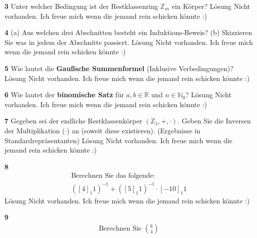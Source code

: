 \documentclass[11pt]{article}
\begin{document}
    \textbf{3} Unter welcher Bedingung ist der Restklassenring \(\mathbb{Z}_m\) ein Körper?\newline
    Lösung Nicht vorhanden. Ich freue mich wenn die jemand rein schicken könnte :)\newline

    \textbf{4} (a) Aus welchen drei Abschnitten besteht ein Induktions-Beweis? (b) Skizzieren Sie was in jedem der Abschnitte passiert.\newline
    Lösung Nicht vorhanden. Ich freue mich wenn die jemand rein schicken könnte :)\newline
    
    \textbf{5} Wie lautet die \textbf{Gaußsche Summenformel} (Inklusive Verbedingungen)?\newline
    Lösung Nicht vorhanden. Ich freue mich wenn die jemand rein schicken könnte :)\newline

    \textbf{6} Wie lautet der \textbf{binomische Satz} für \( a, b \in \mathbb{R} \) und \( n \in \mathbb{N}_0 \)?\newline
    Lösung Nicht vorhanden. Ich freue mich wenn die jemand rein schicken könnte :)\newline

    \textbf{7} Gegeben sei der endliche Restklassenkörper \((\mathbb{Z}_5, +, \cdot)\). Geben Sie die Inversen der Multiplikation (\(\cdot\)) an (soweit diese existieren). (Ergebnisse in Standardrepräsentanten)\newline
    Lösung Nicht vorhanden. Ich freue mich wenn die jemand rein schicken könnte :)\newline

    \textbf{8} \[
                   \begin{gathered}
                       \text{Berechnen Sie das folgende:} \\
                       \left([4]_1 1\right)^{-1} + \left([5]_1 1\right)^{-1} \cdot [-10]_1 1
                   \end{gathered}
    \]\newline
    Lösung Nicht vorhanden. Ich freue mich wenn die jemand rein schicken könnte :)\newline

    \textbf{9} \[
                   \begin{gathered}
                       \text{Berechnen Sie } \binom{6}{4}
                   \end{gathered}
\]
\end{document}
